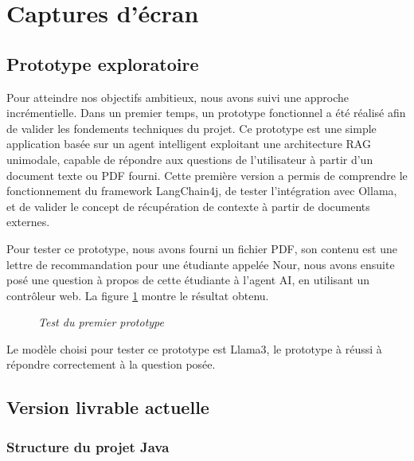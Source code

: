 \documentclass[12pt,a4paper]{report}
\begin{document}
	\section{Captures d'écran}
	
	
	
	\subsection{Prototype exploratoire}
	
	Pour atteindre nos objectifs ambitieux, nous avons suivi une approche incrémentielle. Dans un premier temps, un prototype fonctionnel a été réalisé afin de valider les fondements techniques du projet. Ce prototype est une simple application basée sur un agent intelligent exploitant une architecture RAG unimodale, capable de répondre aux questions de l’utilisateur à partir d’un document texte ou PDF fourni. Cette première version a permis de comprendre le fonctionnement du framework LangChain4j, de tester l’intégration avec Ollama, et de valider le concept de récupération de contexte à partir de documents externes.
	
	Pour tester ce prototype, nous avons fourni un fichier PDF, son contenu est une lettre de recommandation pour une étudiante appelée Nour, nous avons ensuite posé une question à propos de cette étudiante à l'agent AI, en utilisant un contrôleur web. La figure \ref{fig:test-rag} montre le résultat obtenu.
	
	\begin{figure}[H]
		\centering
		\caption{\textit{Test du premier prototype}}
		\label{fig:test-rag}
	\end{figure}
	
	Le modèle choisi pour tester ce prototype est Llama3, le prototype à réussi à répondre correctement à la question posée.
	
	\subsection{Version livrable actuelle}
	
	\subsubsection{Structure du projet Java}
	
\end{document}
